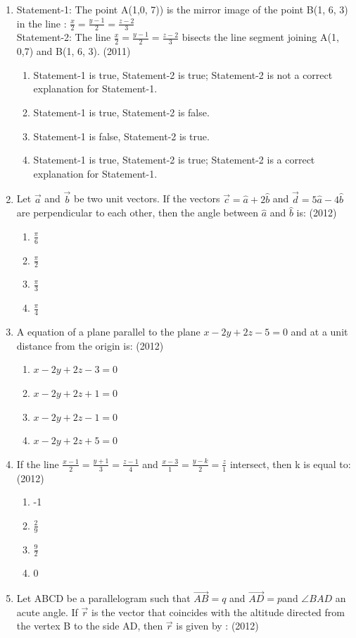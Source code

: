 \documentclass[12pt]{article}
\begin{document}
\begin{enumerate}
\item Statement-1: The point A(1,0, 7)) is the mirror image of the point B(1, 6, 3) in the line : $\frac{x}{2}=\frac{y-1}{2}=\frac{z-2}{3}$  \\
Statement-2: The line $\frac{x}{2}=\frac{y-1}{2}=\frac{z-2}{3}$ bisects the line segment joining A(1, 0,7) and B(1, 6, 3). (2011)
\begin{enumerate}
\item Statement-1 is true, Statement-2 is true; Statement-2 is not a correct explanation for Statement-1.
\item Statement-1 is true, Statement-2 is false.
\item Statement-1 is false, Statement-2 is true.
\item Statement-1 is true, Statement-2 is true; Statement-2 is a correct explanation for Statement-1.
\end{enumerate}
\item Let $\vec{a}$ and $\vec{b}$ be two unit vectors. If the vectors $\vec{c}=\hat{a}+2\hat{b}$ and $\vec{d}=5\hat{a}-4\hat{b}$  are perpendicular to each other, then the angle between $\hat{a}$ and $\hat{b}$ is: (2012)
\begin{enumerate}
\item  $\frac{\pi}{6}$ 
\item  $\frac{\pi}{2}$ 
\item  $\frac{\pi}{3}$ 
\item  $\frac{\pi}{4}$ 
\end{enumerate}
\item A equation of a plane parallel to the plane $x-2y+2z-5=0$ and at a unit distance from the origin is: (2012)
\begin{enumerate}
\item  $x-2y+2z-3=0$
\item  $x-2y+2z+1=0$
\item  $x-2y+2z-1=0$
\item  $x-2y+2z+5=0$
\end{enumerate}
\item If the line $\frac{x-1}{2}=\frac{y+1}{3}=\frac{z-1}{4}$ and $\frac{x-3}{1}=\frac{y-k}{2}=\frac{z}{1}$ intersect, then k is equal to: (2012)
\begin{enumerate}
\item -1
\item $\frac{2}{9}$
\item $\frac{9}{2}$
\item 0
\end{enumerate}
\item Let ABCD be a parallelogram such that $\overrightarrow{AB}=q$ and $\overrightarrow{AD}=p$and $\angle BAD$ an acute angle. If $\vec{r}$ is the vector that coincides with the altitude directed from the vertex B to the side AD, then $\vec{r}$ is given by : (2012)

\end{enumerate}
\end{document}
